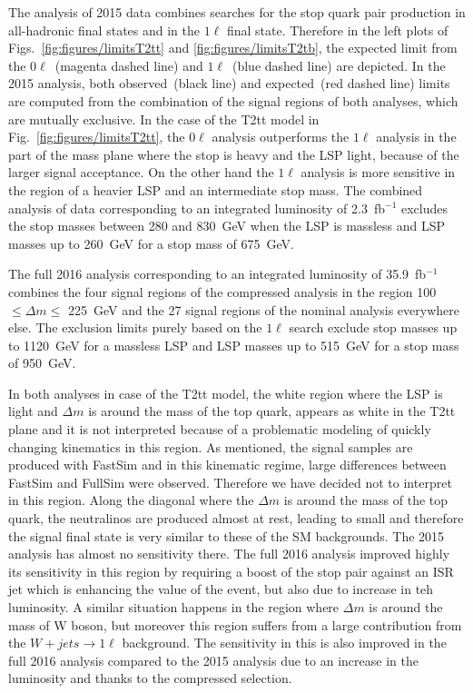 The analysis of 2015 data combines searches for the stop quark pair production in all-hadronic final states and in the $1\ell$ final state. Therefore in the left plots of Figs.~\ref{fig:figures/limitsT2tt} and \ref{fig:figures/limitsT2tb}, the expected limit from the $0\ell$~(magenta dashed line) and $1\ell$~(blue dashed line) are depicted. In the 2015 analysis, both observed~(black line) and expected~(red dashed line) limits are computed from the combination of the signal regions of both analyses, which are mutually exclusive. In the case of the T2tt model in Fig.~\ref{fig:figures/limitsT2tt}, the  $0\ell$ analysis outperforms the $1\ell$ analysis in the part of the mass plane where the stop is heavy and the LSP light, because of the larger signal acceptance. On the other hand the $1\ell$ analysis is more sensitive in the region of a heavier LSP and an intermediate stop mass. The combined analysis of data corresponding to an integrated luminosity of 2.3~fb$^{-1}$ excludes the stop masses between 280 and 830~GeV when the LSP is massless and LSP masses up to 260~GeV for a stop mass of 675~GeV. 

The full 2016 analysis corresponding to an integrated luminosity of 35.9~fb$^{-1}$ combines the four signal regions of the compressed analysis in the region 100 $\leq \Delta m \leq $ 225~GeV and the 27 signal regions of the nominal analysis everywhere else. The exclusion limits purely based on the $1\ell$ search exclude  stop masses up to 1120~GeV for a massless LSP and LSP masses up to 515~GeV for a stop mass of 950~GeV. 

In both analyses in case of the T2tt model, the white region where the LSP is light and $\Delta m$ is around the mass of the top quark, appears as white in the T2tt plane and it is not interpreted because of a problematic modeling of quickly changing kinematics in this region. As mentioned, the signal samples are produced with FastSim and in this kinematic regime, large differences between FastSim and FullSim were observed. Therefore we have decided not to interpret in this region. Along the diagonal where the $\Delta m$ is around the mass of the top quark, the neutralinos are produced almost at rest, leading to  small \MET and therefore the signal final state is very similar to these of the SM backgrounds. The 2015 analysis has almost no sensitivity there. The full 2016 analysis improved highly its sensitivity in this region by requiring a boost of the stop pair against an ISR jet which is enhancing the \MET value of the event, but also due to increase in teh luminosity. A similar situation happens in the region where $\Delta m$ is around the mass of W boson, but moreover this region suffers from a  large contribution from the $W+jets \to 1\ell$ background. The sensitivity in this is also improved in the full 2016 analysis compared to the 2015 analysis due to an increase in the luminosity and  thanks to the compressed selection. 

